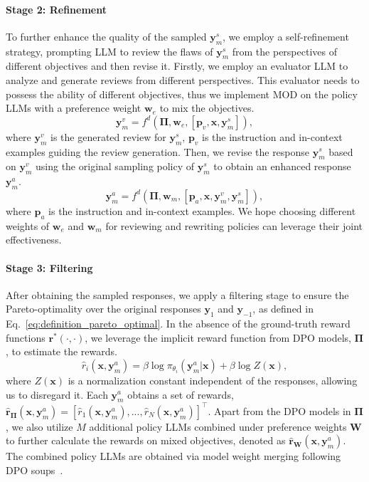 \paragraph{Stage 2: Refinement} 
To further enhance the quality of the sampled $\textbf{y}_m^s$, we employ a self-refinement strategy, prompting LLM to review the flaws of $\textbf{y}^s_m$ from the perspectives of different objectives and then revise it. 
Firstly, we employ an evaluator LLM to analyze and generate reviews from different perspectives. This evaluator needs to possess the ability of different objectives, thus we implement MOD on the policy LLMs with a preference weight $\textbf{w}_e$ to mix the objectives. 
\begin{equation}
    \textbf{y}_m^v = f^d(\boldsymbol \Pi, \textbf{w}_e, [\textbf{p}_v, \textbf{x}, \textbf{y}^s_m]),
\end{equation}
where $\textbf{y}_m^v$ is the generated review for $\textbf{y}^s_m$, $\textbf{p}_v$ is the instruction and in-context examples
guiding the review generation. 
Then, we revise the response $\textbf{y}_m^s$ based on $\textbf{y}^v_m$ using the original sampling policy of $\textbf{y}^s_m$ to obtain an enhanced response $\textbf{y}^a_m$. 
\begin{equation}
    \textbf{y}_m^a = f^d(\boldsymbol \Pi, \textbf{w}_m, [\textbf{p}_a, \textbf{x}, \textbf{y}^v_m, \textbf{y}^s_m]),
\end{equation}
where $\textbf{p}_a$ is the instruction and in-context examples. We hope choosing different weights of $\textbf{w}_e$ and $\textbf{w}_m$ for reviewing and rewriting policies can leverage their joint effectiveness. 

\paragraph{Stage 3: Filtering}
After obtaining the sampled responses, we apply a filtering stage to ensure the Pareto-optimality over the original responses $\textbf{y}_1$ and $\textbf{y}_{-1}$, as defined in Eq.~\eqref{eq:definition_pareto_optimal}. 
In the absence of the ground-truth reward functions $\textbf{r}^*(\cdot, \cdot)$, we leverage the implicit reward function from DPO models, \ie $\boldsymbol \Pi$, to estimate the rewards. 
\begin{equation}
    \hat{r}_i(\textbf{x}, \textbf{y}^a_m) = \beta\log\pi_{\theta_i}(\textbf{y}^a_m|\textbf{x}) + \beta\log Z(\textbf{x}),
\end{equation}
where $Z(\textbf{x})$ is a normalization constant independent of the responses, allowing us to disregard it. 
Each $\textbf{y}^a_m$ obtains a set of rewards, $\hat{\textbf{r}}_{\boldsymbol \Pi}(\textbf{x}, \textbf{y}^a_m) = [\hat{r}_1(\textbf{x}, \textbf{y}^a_m), ..., \hat{r}_N(\textbf{x}, \textbf{y}^a_m)]^{\intercal}$. 
Apart from the DPO models in $\boldsymbol \Pi$, we also utilize $M$ additional policy LLMs combined under preference weights $\textbf{W}$ to further calculate the rewards on mixed objectives, denoted as $\hat{\textbf{r}}_{\textbf{W}} (\textbf{x}, \textbf{y}^a_m)$. The combined policy LLMs are obtained via model weight merging following DPO soups~\cite{DBLP:conf/nips/RameCDGSSC23}. 

